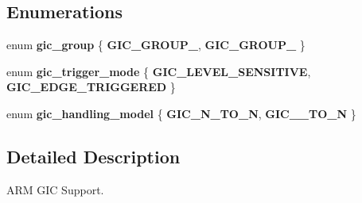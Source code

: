 \subsection*{Enumerations}
\begin{DoxyCompactItemize}
\item 
\mbox{\label{arm-gic_8h_a3ce7aa95ce8a2ae6f44e078aea4c6bc1}} 
enum {\bfseries gic\+\_\+group} \{ {\bfseries G\+I\+C\+\_\+\+G\+R\+O\+U\+P\+\_}, 
{\bfseries G\+I\+C\+\_\+\+G\+R\+O\+U\+P\+\_}
 \}
\item 
\mbox{\label{arm-gic_8h_a1f40dc7396322dc6bb171d1dde20f21d}} 
enum {\bfseries gic\+\_\+trigger\+\_\+mode} \{ {\bfseries G\+I\+C\+\_\+\+L\+E\+V\+E\+L\+\_\+\+S\+E\+N\+S\+I\+T\+I\+VE}, 
{\bfseries G\+I\+C\+\_\+\+E\+D\+G\+E\+\_\+\+T\+R\+I\+G\+G\+E\+R\+ED}
 \}
\item 
\mbox{\label{arm-gic_8h_a4b8ebad603239740eecec011492094d1}} 
enum {\bfseries gic\+\_\+handling\+\_\+model} \{ {\bfseries G\+I\+C\+\_\+\+N\+\_\+\+T\+O\+\_\+N}, 
{\bfseries G\+I\+C\+\_\+\_\+\+T\+O\+\_\+N}
 \}
\end{DoxyCompactItemize}


\subsection{Detailed Description}
A\+RM G\+IC Support. 

